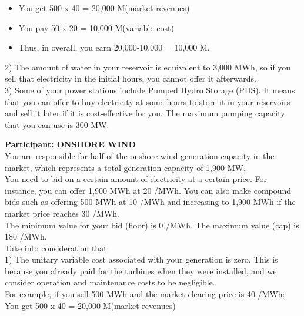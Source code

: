 \documentclass[3p]{elsarticle} %
\begin{document}
\begin{itemize}
\item You get 500 x 40 = 20,000 M\EUR (market revenues)
\item You pay 50 x 20 = 10,000 M\EUR (variable cost)
\item Thus, in overall, you earn 20,000-10,000 = 10,000 M\EUR.
\end{itemize}

2)	The amount of water in your reservoir is equivalent to 3,000 MWh, so if you sell that electricity in the initial hours, you cannot offer it afterwards.\\

3)	Some of your power stations include Pumped Hydro Storage (PHS). It means that you can offer to buy electricity at some hours to store it in your reservoirs and sell it later if it is cost-effective for you. The maximum pumping capacity that you can use is 300 MW.

\newpage

\textbf{Participant: ONSHORE WIND} \\

You are responsible for half of the onshore wind generation capacity in the market, which represents a total generation capacity of 1,900 MW. \\

You need to bid on a certain amount of electricity at a certain price. For instance, you can offer 1,900 MWh at 20 \EUR/MWh. You can also make compound bids such as offering 500 MWh at 10 \EUR/MWh and increasing to 1,900 MWh if the market price reaches 30 \EUR/MWh. \\

The minimum value for your bid (floor) is 0 \EUR/MWh. The maximum value (cap) is 180 \EUR/MWh. \\

Take into consideration that: \\

1)	The unitary variable cost associated with your generation is zero. This is because you already paid for the turbines when they were installed, and we consider operation and maintenance costs to be negligible. \\

For example, if you sell 500 MWh and the market-clearing price is 40 \EUR/MWh: \\

You get 500 x 40 = 20,000 M\EUR (market revenues) \\
\end{document}
